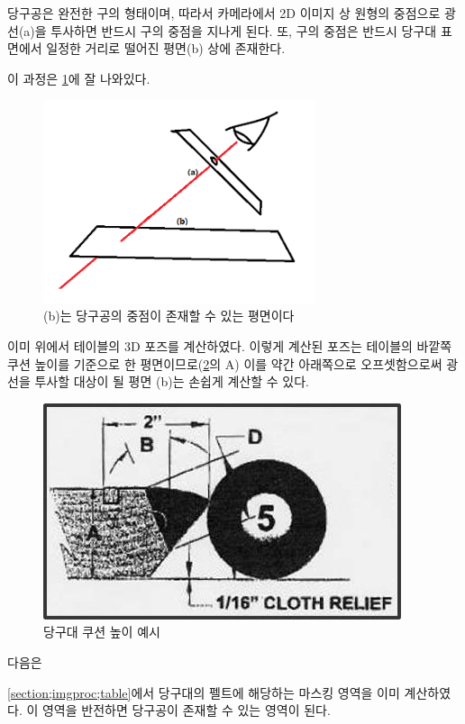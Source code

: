 \documentclass[11pt]{oblivoir}
\begin{document}
당구공은 완전한 구의 형태이며, 따라서 카메라에서 2D 이미지 상 원형의 중점으로 광선(a)을 투사하면 반드시 구의 중점을 지나게 된다. 또, 구의 중점은 반드시 당구대 표면에서 일정한 거리로 떨어진 평면(b) 상에 존재한다.

이 과정은 \cref{fig;ball-recognition-howto}에 잘 나와있다.

\begin{figure}[ht]
        \centering
        \includegraphics[width=8cm]{img/ball-recognition-howto.png}
        \caption{(b)는 당구공의 중점이 존재할 수 있는 평면이다}
        \label{fig;ball-recognition-howto}
\end{figure}

이미 위에서 테이블의 3D 포즈를 계산하였다. 이렇게 계산된 포즈는 테이블의 바깥쪽 쿠션 높이를 기준으로 한 평면이므로(\cref{fig;cushion-height-example}의 A) 이를 약간 아래쪽으로 오프셋함으로써 광선을 투사할 대상이 될 평면 (b)는 손쉽게 계산할 수 있다.

\begin{figure}[ht]
        \centering
        \includegraphics{img/cushion-height-example.png}
        \caption[Caption for LOF]{당구대 쿠션 높이 예시\footnotemark}
        \label{fig;cushion-height-example}
\end{figure}

다음은 

\cref{section;imgproc;table}에서 당구대의 펠트에 해당하는 마스킹 영역을 이미 계산하였다. 이 영역을 반전하면 당구공이 존재할 수 있는 영역이 된다.
\end{document}
